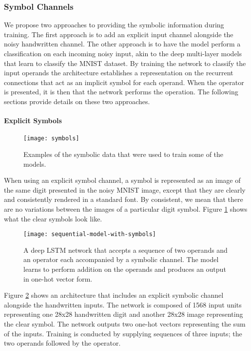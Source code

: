 \subsubsection{Symbol Channels} \label{sec:theory-approach-methodology-sequential-models}

We propose two approaches to providing the symbolic information during training. The first approach is to add an explicit input channel alongside the noisy handwritten channel. The other approach is to have the model perform a classification on each incoming noisy input, akin to the deep multi-layer models that learn to classify the MNIST dataset. By training the network to classify the input operands the architecture establishes a representation on the recurrent connections that act as an implicit symbol for each operand. When the operator is presented, it is then that the network performs the operation. The following sections provide details on these two approaches.

\paragraph{Explicit Symbols}

\begin{figure}[t]
	\centering
	\texttt{[image: symbols]}
	\caption{Examples of the symbolic data that were used to train some of the models.}
	\label{fig:symbols}
\end{figure}

When using an explicit symbol channel, a symbol is represented as an image of the same digit presented in the noisy MNIST image,  except that they are clearly and consistently rendered in a standard font. By consistent, we mean that there are no variations between the images of a particular digit symbol. Figure \ref{fig:symbols} shows what the clear symbols look like.

\begin{figure}[t]
	\centering
	\texttt{[image: sequential-model-with-symbols]}
	\caption{A deep LSTM network that accepts a sequence of two operands and an operator each accompanied by a symbolic channel. The model learns to perform addition on the operands and produces an output in one-hot vector form.}
	\label{fig:sequential-model-with-symbols}
\end{figure}

Figure \ref{fig:sequential-model-with-symbols} shows an architecture that includes an explicit symbolic channel alongside the handwritten inputs. The network is composed of 1568 input units representing one 28x28 handwritten digit and another 28x28 image representing the clear symbol. The network outputs two one-hot vectors representing the sum of the inputs. Training is conducted by supplying sequences of three inputs; the two operands followed by the operator.

